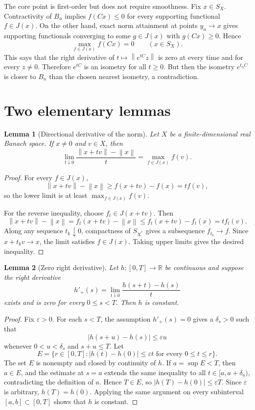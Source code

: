 \documentclass[11pt]{article}
\newtheorem{lemma}{Lemma}
\newcommand{\R}{\mathbb{R}}
\newcommand{\SX}{S_X}
\newcommand{\norm}[1]{\left\lVert #1 \right\rVert}
\begin{document}
The core point is first-order but does not require smoothness.  Fix
\(x\in \SX\).  Contractivity of \(B_n\) implies \(f(Cx)\le 0\) for every
supporting functional \(f\in J(x)\).  On the other hand, exact norm attainment
at points \(y_n\to x\) gives supporting functionals converging to some
\(g\in J(x)\) with \(g(Cx)\ge 0\).  Hence
\[
  \max_{f\in J(x)} f(Cx)=0\qquad(x\in \SX).
\]
This says that the right derivative of \(t\mapsto\norm{e^{tC}z}\) is zero at
every time and for every \(z\ne0\).  Therefore \(e^{tC}\) is an isometry for
all \(t\ge0\).  But then the isometry \(e^{t_nC}\) is closer to \(B_n\) than
the chosen nearest isometry, a contradiction.

\section*{Two elementary lemmas}

\begin{lemma}[Directional derivative of the norm]
Let \(X\) be a finite-dimensional real Banach space.  If \(x\ne0\) and
\(v\in X\), then
\[
  \lim_{t\downarrow0}\frac{\norm{x+tv}-\norm{x}}{t}
  =\max_{f\in J(x)} f(v).
\]
\end{lemma}

\begin{proof}
For every \(f\in J(x)\),
\[
  \norm{x+tv}-\norm{x}\ge f(x+tv)-f(x)=t f(v),
\]
so the lower limit is at least \(\max_{f\in J(x)}f(v)\).

For the reverse inequality, choose \(f_t\in J(x+tv)\).  Then
\[
  \norm{x+tv}-\norm{x}
  = f_t(x+tv)-\norm{x}
  \le f_t(x+tv)-f_t(x)
  = t f_t(v).
\]
Along any sequence \(t_k\downarrow0\), compactness of \(S_{X^*}\) gives a
subsequence \(f_{t_k}\to f\).  Since \(x+t_kv\to x\), the limit satisfies
\(f\in J(x)\).  Taking upper limits gives the desired inequality.
\end{proof}

\begin{lemma}[Zero right derivative]
Let \(h:[0,T]\to\R\) be continuous and suppose the right derivative
\[
  h'_+(s)=\lim_{t\downarrow0}\frac{h(s+t)-h(s)}{t}
\]
exists and is zero for every \(0\le s<T\).  Then \(h\) is constant.
\end{lemma}

\begin{proof}
Fix \(\varepsilon>0\).  For each \(s<T\), the assumption \(h'_+(s)=0\) gives a
\(\delta_s>0\) such that
\[
  |h(s+u)-h(s)|\le \varepsilon u
\]
whenever \(0<u<\delta_s\) and \(s+u\le T\).  Let
\[
  E=\{r\in[0,T]: |h(t)-h(0)|\le \varepsilon t
      \text{ for every }0\le t\le r\}.
\]
The set \(E\) is nonempty and closed by continuity of \(h\).  If
\(a=\sup E<T\), then \(a\in E\), and the estimate at \(s=a\) extends the same
inequality to all \(t\in[a,a+\delta_a)\), contradicting the definition of
\(a\).  Hence \(T\in E\), so \(|h(T)-h(0)|\le\varepsilon T\).  Since
\(\varepsilon\) is arbitrary, \(h(T)=h(0)\).  Applying the same argument on
every subinterval \([a,b]\subset[0,T]\) shows that \(h\) is constant.
\end{proof}
\end{document}
